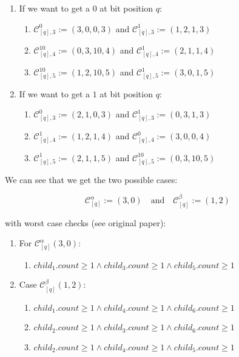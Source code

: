 \documentclass{article}
\newtheorem*{theorem A}{Theorem A}
\newtheorem*{theorem B}{N\"olker's Theorem}
\theoremstyle{remark}
\theoremstyle{remark}
\begin{document}
\begin{enumerate}
    \item If we want to get a $0$ at bit position $q$:
        \begin{enumerate}
            \item $\mathcal{C}^{0}_{[q],3} := \left(3, 0, 0, 3\right)$ and $\mathcal{C}^{1}_{[q],3} := \left(1, 2, 1, 3\right)$
            \item $\mathcal{C}^{10}_{[q],4} := \left(0, 3, 10, 4\right)$ and $\mathcal{C}^{1}_{[q],4} := \left(2, 1, 1, 4\right)$
            \item $\mathcal{C}^{10}_{[q],5} := \left(1, 2, 10, 5\right)$ and $\mathcal{C}^{1}_{[q],5} := \left(3, 0, 1, 5\right)$
        \end{enumerate}

    \item If we want to get a $1$ at bit position $q$:
        \begin{enumerate}
            \item $\mathcal{C}^{0}_{[q],3} := \left(2, 1, 0, 3\right)$ and $\mathcal{C}^{1}_{[q],3} := \left(0, 3, 1, 3\right)$
            \item $\mathcal{C}^{1}_{[q],4} := \left(1, 2, 1, 4\right)$ and $\mathcal{C}^{0}_{[q],4} := \left(3, 0, 0, 4\right)$
            \item $\mathcal{C}^{1}_{[q],5} := \left(2, 1, 1, 5\right)$ and $\mathcal{C}^{10}_{[q],5} := \left(0, 3, 10, 5\right)$
        \end{enumerate}
\label{enum:background_Cpairs}
\end{enumerate} 

We can see that we get the two possible cases:

\begin{equation}
    \mathcal{C}^{\alpha}_{[q]} := \left(3,0\right) \quad \mathrm{and} \quad \mathcal{C}^{\beta}_{[q]} := \left(1,2\right)
\label{eq:ruleCase_01}
\end{equation}

with worst case checks (see original paper):

\begin{enumerate}
    \item For $\mathcal{C}^{\alpha}_{[q]}\left(3,0\right)$:
        \begin{enumerate}
            \item $child_{1}.count \geq 1 \wedge child_{3}.count \geq 1 \wedge child_{5}.count \geq 1$
        \end{enumerate}


  \item Case $\mathcal{C}^{\beta}_{[q]}\left(1,2\right)$:
        \begin{enumerate}
            \item $child_{1}.count \geq 1 \wedge child_{4}.count \geq 1 \wedge child_{6}.count \geq 1$
            \item $child_{2}.count \geq 1 \wedge child_{3}.count \geq 1 \wedge child_{6}.count \geq 1$
            \item $child_{2}.count \geq 1 \wedge child_{4}.count \geq 1 \wedge child_{5}.count \geq 1$
        \end{enumerate}
\end{enumerate}
\end{document}

